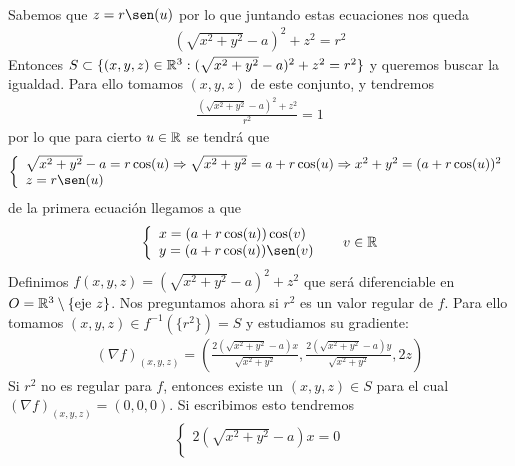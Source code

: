 \begin{ejemplo}
\begin{enumerate}
\begin{gather*}
        \end{gather*}
        Sabemos que $z=r\sen(u)$ por lo que juntando estas ecuaciones nos queda
        \begin{gather*}
            (\sqrt{x^2 + y^2}-a)^2 + z^2 = r^2
        \end{gather*}
        Entonces $S\subset \{(x,y,z)\in \mathbb{R}^3 : (\sqrt{x^2 + y^2}-a)^2 + z^2 = r^2\}$ y queremos buscar la igualdad. Para ello tomamos $(x,y,z)$ de este conjunto, y tendremos
        \begin{gather*}
            \frac{(\sqrt{x^2 + y^2}-a)^2 + z^2}{r^2} = 1
        \end{gather*}
        por lo que para cierto $u\in \mathbb{R}$ se tendrá que
        \begin{gather*}
            \left\{
            \begin{array}{l}
                \sqrt{x^2 + y^2} -a = r\cos(u) \Rightarrow \sqrt{x^2 + y^2} = a + r\cos(u) \Rightarrow x^2 + y^2 = (a+r\cos(u))^2\\
                z = r\sen(u) 
            \end{array}
            \right.
        \end{gather*}
        de la primera ecuación llegamos a que 
        \begin{gather*}
            \left\{
            \begin{array}{l}
                x = (a+r\cos(u))\cos(v)\\
                y = (a+r\cos(u))\sen(v)
            \end{array}
            \right. \ \ \ \ v\in \bb{R}
        \end{gather*}
        Definimos $f(x,y,z) = (\sqrt{x^2 + y^2} -a)^2 + z^2$ que será diferenciable en $O=\mathbb{R}^3 \setminus\{\text{eje }z\}$. Nos preguntamos ahora si $r^2$ es un valor regular de $f$. Para ello tomamos $(x,y,z)\in f^{-1}(\{r^2\})=S$ y estudiamos su gradiente:
        \begin{gather*}
            (\nabla f)_{(x,y,z)} = \left(\frac{2(\sqrt{x^2 + y^2} -a)x}{\sqrt{x^2 + y^2}}, \frac{2(\sqrt{x^2 + y^2} -a)y}{\sqrt{x^2 + y^2}}, 2z \right) 
        \end{gather*}
        Si $r^2$ no es regular para $f$, entonces existe un $(x,y,z)\in S$ para el cual $(\nabla f)_{(x,y,z)} = (0,0,0)$. Si escribimos esto tendremos
        \begin{gather*}
            \left\{
            \begin{array}{l}
                2(\sqrt{x^2 + y^2} -a)x = 0\\

\end{array}
\end{gather*}
\end{enumerate}
\end{ejemplo}
